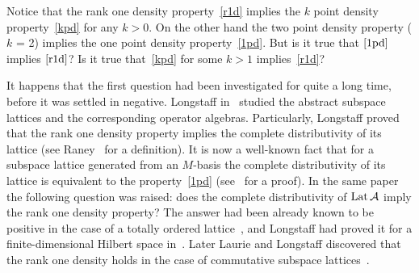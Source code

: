 \documentclass[12pt,oneside,a4paper]{amsart}
\begin{document}
  Notice that the rank one density property~\eqref{r1d} implies the $k$ point density property~\eqref{kpd} for any $k > 0$.
  On the other hand the two point density property ($k$ = 2) implies the one point density property~\eqref{1pd}.
  But is it true that $\eqref{1pd}$ implies $\eqref{r1d}$?
  Is it true that~\eqref{kpd} for some $k > 1$ implies~\eqref{r1d}?

  It happens that the first question had been investigated for quite a long time, before it was settled in negative.
  Long\-staff in~\cite{longstaff} studied the abstract subspace lattices and the corresponding operator algebras.
  Particularly, Longstaff proved that the rank one density property implies
    the complete distributivity of its lattice (see Raney~\cite{raney} for a definition).
  It is now a well-known fact that for a subspace lattice generated from an $M$-basis
    the complete distributivity of its lattice is equivalent to
    the property~\eqref{1pd} (see~\cite{argyroslambrou} for a proof).
  In the same paper the following question was raised: does the complete distributivity of $\operatorname{Lat}\mathcal{A}$ imply the rank one density property?
  The answer had been already known to be positive in the case of a totally ordered lattice~\cite{erdos}, and
    Longstaff had proved it for a finite-dimensional Hilbert space in~\cite{longstaff}.
  Later Laurie and Longstaff discovered that the rank one density holds in the case of commutative subspace lattices~\cite{laurielongstaff}.
\end{document}
